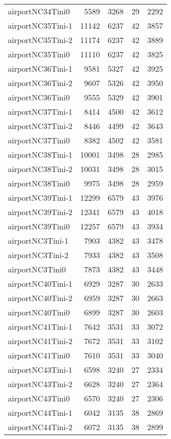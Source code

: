 \documentclass[../../../thesis.tex]{subfiles}
\begin{document}
\begin{longtable}{lrrrr}
airportNC34Tini0 & 5589 & 3268 & 29 & 2292 \\
airportNC35Tini-1 & 11142 & 6237 & 42 & 3857 \\
airportNC35Tini-2 & 11174 & 6237 & 42 & 3889 \\
airportNC35Tini0 & 11110 & 6237 & 42 & 3825 \\
airportNC36Tini-1 & 9581 & 5327 & 42 & 3925 \\
airportNC36Tini-2 & 9607 & 5326 & 42 & 3950 \\
airportNC36Tini0 & 9555 & 5329 & 42 & 3901 \\
airportNC37Tini-1 & 8414 & 4500 & 42 & 3612 \\
airportNC37Tini-2 & 8446 & 4499 & 42 & 3643 \\
airportNC37Tini0 & 8382 & 4502 & 42 & 3581 \\
airportNC38Tini-1 & 10001 & 3498 & 28 & 2985 \\
airportNC38Tini-2 & 10031 & 3498 & 28 & 3015 \\
airportNC38Tini0 & 9975 & 3498 & 28 & 2959 \\
airportNC39Tini-1 & 12299 & 6579 & 43 & 3976 \\
airportNC39Tini-2 & 12341 & 6579 & 43 & 4018 \\
airportNC39Tini0 & 12257 & 6579 & 43 & 3934 \\
airportNC3Tini-1 & 7903 & 4382 & 43 & 3478 \\
airportNC3Tini-2 & 7933 & 4382 & 43 & 3508 \\
airportNC3Tini0 & 7873 & 4382 & 43 & 3448 \\
airportNC40Tini-1 & 6929 & 3287 & 30 & 2633 \\
airportNC40Tini-2 & 6959 & 3287 & 30 & 2663 \\
airportNC40Tini0 & 6899 & 3287 & 30 & 2603 \\
airportNC41Tini-1 & 7642 & 3531 & 33 & 3072 \\
airportNC41Tini-2 & 7672 & 3531 & 33 & 3102 \\
airportNC41Tini0 & 7610 & 3531 & 33 & 3040 \\
airportNC43Tini-1 & 6598 & 3240 & 27 & 2334 \\
airportNC43Tini-2 & 6628 & 3240 & 27 & 2364 \\
airportNC43Tini0 & 6570 & 3240 & 27 & 2306 \\
airportNC44Tini-1 & 6042 & 3135 & 38 & 2869 \\
airportNC44Tini-2 & 6072 & 3135 & 38 & 2899 \\

\end{longtable}
\end{document}
